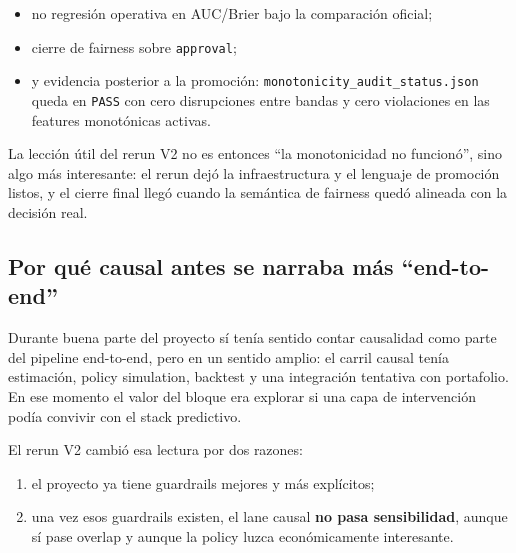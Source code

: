 \documentclass[
  spanish,
  11pt,
  letterpaper,
]{scrbook}
\providecommand{\tightlist}{%
  \setlength{\itemsep}{0pt}\setlength{\parskip}{0pt}}
\theoremstyle{plain}
\theoremstyle{remark}
\begin{document}
\begin{itemize}
\tightlist
\item
  no regresión operativa en AUC/Brier bajo la comparación oficial;
\item
  cierre de fairness sobre \texttt{approval};
\item
  y evidencia posterior a la promoción:
  \texttt{monotonicity\_audit\_status.json} queda en \texttt{PASS} con
  cero disrupciones entre bandas y cero violaciones en las features
  monotónicas activas.
\end{itemize}

La lección útil del rerun V2 no es entonces ``la monotonicidad no
funcionó'', sino algo más interesante: el rerun dejó la infraestructura
y el lenguaje de promoción listos, y el cierre final llegó cuando la
semántica de fairness quedó alineada con la decisión real.

\subsection{Por qué causal antes se narraba más
``end-to-end''}\label{por-quuxe9-causal-antes-se-narraba-muxe1s-end-to-end}

Durante buena parte del proyecto sí tenía sentido contar causalidad como
parte del pipeline end-to-end, pero en un sentido amplio: el carril
causal tenía estimación, policy simulation, backtest y una integración
tentativa con portafolio. En ese momento el valor del bloque era
explorar si una capa de intervención podía convivir con el stack
predictivo.

El rerun V2 cambió esa lectura por dos razones:

\begin{enumerate}
\def\labelenumi{\arabic{enumi}.}
\tightlist
\item
  el proyecto ya tiene guardrails mejores y más explícitos;
\item
  una vez esos guardrails existen, el lane causal \textbf{no pasa
  sensibilidad}, aunque sí pase overlap y aunque la policy luzca
  económicamente interesante.
\end{enumerate}
\end{document}
